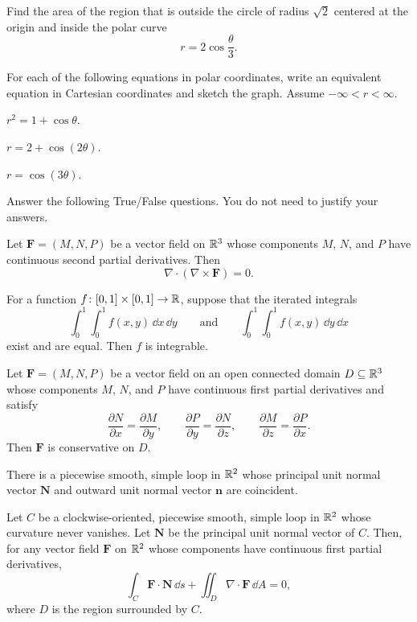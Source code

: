 \begin{problem}
Find the area of the region that is outside the circle of radius $\sqrt2$ centered at the origin and inside the polar curve
\[
r=2\cos\frac{\theta}{3}.
\]
\end{problem}

\begin{problem}
For each of the following equations in polar coordinates, write an equivalent equation in Cartesian coordinates and sketch the graph. Assume $-\infty<r<\infty$.
\begin{problemsubparts}
\item $r^2=1+\cos\theta$.
\item $r=2+\cos(2\theta)$.
\item $r=\cos(3\theta)$.
\end{problemsubparts}
\end{problem}

\begin{problem}
Answer the following True/False questions. You do not need to justify your answers.
\begin{problemsubparts}
\item Let $\mathbf F=(M, N, P)$ be a vector field on $\mathbb{R}^3$ whose components $M$, $N$, and $P$ have continuous second partial derivatives. Then
\[
\nabla\cdot(\nabla\times\mathbf F)=0.
\]
\item For a function $f\colon[0, 1]\times[0, 1]\to\mathbb{R}$, suppose that the iterated integrals
\[
\int_0^1\int_0^1 f(x, y)\,\dd x\,\dd y
\qquad\text{and}\qquad
\int_0^1\int_0^1 f(x, y)\,\dd y\,\dd x
\]
exist and are equal. Then $f$ is integrable.
\item Let $\mathbf F=(M, N, P)$ be a vector field on an open connected domain $D\subseteq\mathbb{R}^3$ whose components $M$, $N$, and $P$ have continuous first partial derivatives and satisfy
\[
\frac{\partial N}{\partial x}=\frac{\partial M}{\partial y},
\qquad
\frac{\partial P}{\partial y}=\frac{\partial N}{\partial z},
\qquad
\frac{\partial M}{\partial z}=\frac{\partial P}{\partial x}.
\]
Then $\mathbf F$ is conservative on $D$.
\item There is a piecewise smooth, simple loop in $\mathbb{R}^2$ whose principal unit normal vector $\mathbf N$ and outward unit normal vector $\mathbf n$ are coincident.
\item Let $C$ be a clockwise-oriented, piecewise smooth, simple loop in $\mathbb{R}^2$ whose curvature never vanishes. Let $\mathbf N$ be the principal unit normal vector of $C$. Then, for any vector field $\mathbf F$ on $\mathbb{R}^2$ whose components have continuous first partial derivatives,
\[
\int_C \mathbf F\cdot\mathbf N\,\dd s
+
\iint_D \nabla\cdot\mathbf F\,\dd A
=0,
\]
where $D$ is the region surrounded by $C$.
\end{problemsubparts}
\end{problem}

